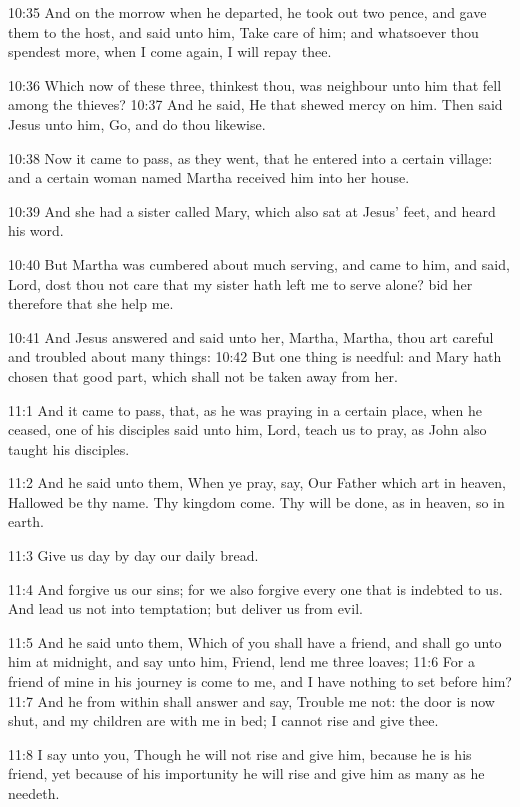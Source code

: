 10:35 And on the morrow when he departed, he took out two pence, and
gave them to the host, and said unto him, Take care of him; and
whatsoever thou spendest more, when I come again, I will repay thee.

10:36 Which now of these three, thinkest thou, was neighbour unto him
that fell among the thieves?  10:37 And he said, He that shewed mercy
on him. Then said Jesus unto him, Go, and do thou likewise.

10:38 Now it came to pass, as they went, that he entered into a
certain village: and a certain woman named Martha received him into
her house.

10:39 And she had a sister called Mary, which also sat at Jesus' feet,
and heard his word.

10:40 But Martha was cumbered about much serving, and came to him, and
said, Lord, dost thou not care that my sister hath left me to serve
alone?  bid her therefore that she help me.

10:41 And Jesus answered and said unto her, Martha, Martha, thou art
careful and troubled about many things: 10:42 But one thing is
needful: and Mary hath chosen that good part, which shall not be taken
away from her.

11:1 And it came to pass, that, as he was praying in a certain place,
when he ceased, one of his disciples said unto him, Lord, teach us to
pray, as John also taught his disciples.

11:2 And he said unto them, When ye pray, say, Our Father which art in
heaven, Hallowed be thy name. Thy kingdom come. Thy will be done, as
in heaven, so in earth.

11:3 Give us day by day our daily bread.

11:4 And forgive us our sins; for we also forgive every one that is
indebted to us. And lead us not into temptation; but deliver us from
evil.

11:5 And he said unto them, Which of you shall have a friend, and
shall go unto him at midnight, and say unto him, Friend, lend me three
loaves; 11:6 For a friend of mine in his journey is come to me, and I
have nothing to set before him?  11:7 And he from within shall answer
and say, Trouble me not: the door is now shut, and my children are
with me in bed; I cannot rise and give thee.

11:8 I say unto you, Though he will not rise and give him, because he
is his friend, yet because of his importunity he will rise and give
him as many as he needeth.

